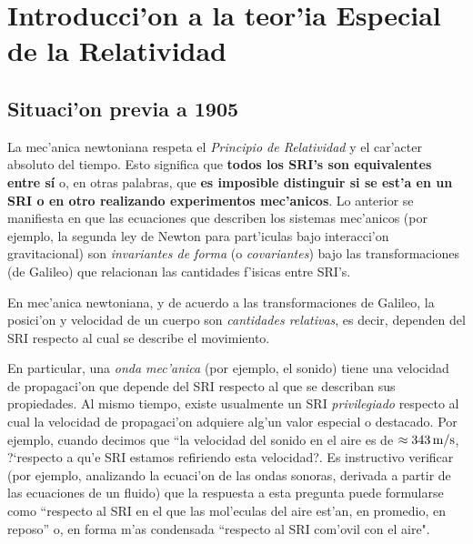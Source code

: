 \chapter{Introducci'on a la teor'ia Especial de la Relatividad}

\section{Situaci'on previa a 1905}

La mec'anica newtoniana respeta el \textit{Principio de Relatividad} y el car'acter absoluto del tiempo. Esto significa que \textbf{todos los SRI's son equivalentes entre s\'i} o, en otras palabras, que \textbf{es imposible distinguir si se est'a en un SRI o en otro realizando experimentos mec'anicos}.
Lo anterior se manifiesta en que las ecuaciones que describen los sistemas mec'anicos (por ejemplo, la segunda ley de Newton para part'iculas bajo interacci'on gravitacional) son \textit{invariantes de forma} (o \textit{covariantes}) bajo las transformaciones (de Galileo) que relacionan las cantidades f'isicas entre SRI's.

En mec'anica newtoniana, y de acuerdo a las transformaciones de Galileo, la
posici'on y velocidad de un cuerpo  son \textit{cantidades relativas}, es decir, dependen del SRI respecto al cual se describe el movimiento.

En particular, una \textit{onda mec'anica} (por ejemplo, el sonido) tiene una velocidad de propagaci'on que depende del SRI respecto al que se describan sus propiedades. Al mismo tiempo, existe usualmente un SRI \textit{privilegiado} respecto al cual la velocidad de propagaci'on adquiere alg'un valor especial o destacado.
Por ejemplo, cuando decimos que ``la velocidad del sonido en el aire es de $\approx 343\,\rm m/s$, ?`respecto a qu'e SRI estamos refiriendo esta velocidad?. Es instructivo verificar (por ejemplo, analizando la ecuaci'on de las ondas sonoras, derivada a partir de las ecuaciones de un fluido) que la respuesta a esta pregunta puede formularse como ``respecto al SRI en el que las mol'eculas del aire est'an, en promedio, en reposo'' o, en forma m'as condensada ``respecto al SRI com'ovil con el aire".

